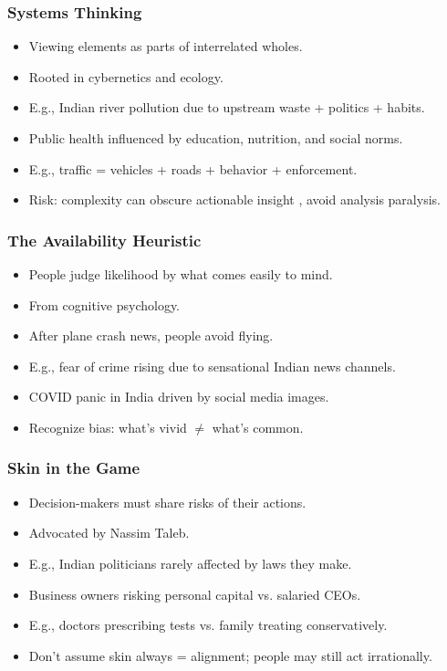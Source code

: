 \begin{frame}[fragile]\frametitle{Systems Thinking}
  \begin{itemize}
    \item Viewing elements as parts of interrelated wholes.
    \item Rooted in cybernetics and ecology.
    \item E.g., Indian river pollution due to upstream waste + politics + habits.
    \item Public health influenced by education, nutrition, and social norms.
    \item E.g., traffic = vehicles + roads + behavior + enforcement.
    \item Risk: complexity can obscure actionable insight , avoid analysis paralysis.
  \end{itemize}
\end{frame}

\begin{frame}[fragile]\frametitle{The Availability Heuristic}
  \begin{itemize}
    \item People judge likelihood by what comes easily to mind.
    \item From cognitive psychology.
    \item After plane crash news, people avoid flying.
    \item E.g., fear of crime rising due to sensational Indian news channels.
    \item COVID panic in India driven by social media images.
    \item Recognize bias: what's vivid $\neq$ what's common.
  \end{itemize}
\end{frame}

\begin{frame}[fragile]\frametitle{Skin in the Game}
  \begin{itemize}
    \item Decision-makers must share risks of their actions.
    \item Advocated by Nassim Taleb.
    \item E.g., Indian politicians rarely affected by laws they make.
    \item Business owners risking personal capital vs. salaried CEOs.
    \item E.g., doctors prescribing tests vs. family treating conservatively.
    \item Don't assume skin always = alignment; people may still act irrationally.
  \end{itemize}
\end{frame}

